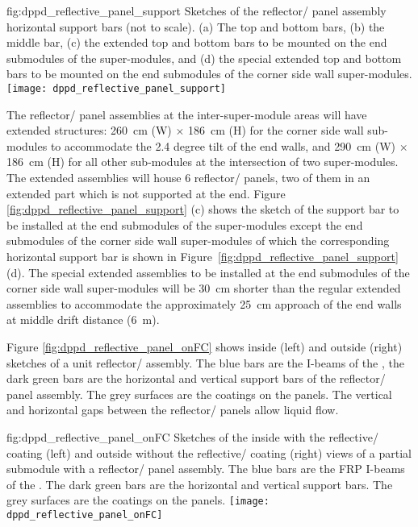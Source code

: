 \begin{dunefigure}{fig:dppd_reflective_panel_support}
{Sketches of the reflector/ panel assembly horizontal support bars (not to scale). (a) The top and bottom bars, (b) the middle bar, (c) the extended top and bottom bars to be mounted on the end submodules of the  super-modules, and (d) the special extended top and bottom bars to be mounted on the end submodules of the corner  side wall super-modules.}
\texttt{[image: dppd\_reflective\_panel\_support]}
\end{dunefigure}

The reflector/ panel assemblies at the inter-super-module areas will have extended structures: \SI{260}{\cm} (W) $\times$ \SI{186}{\cm} (H) for the corner side wall  sub-modules to accommodate the \num{2.4} degree tilt of the end walls, and \SI{290}{\cm} (W) $\times$ \SI{186}{\cm} (H) for all other  sub-modules at the intersection of two  super-modules. The extended assemblies will house \num{6} reflector/ panels, two of them in an extended part which is not supported at the end. Figure \ref{fig:dppd_reflective_panel_support} (c) shows the sketch of the support bar to be installed at the end submodules of the  super-modules except the end submodules of the corner  side wall super-modules of which the corresponding horizontal support bar is shown in Figure~\ref{fig:dppd_reflective_panel_support} (d). The special extended assemblies to be installed at the end submodules of the corner side wall super-modules will be \SI{30}{\cm} shorter than the regular extended assemblies to accommodate the approximately \SI{25}{\cm} approach of the end walls at middle drift distance (\SI{6}{\m}).

Figure \ref{fig:dppd_reflective_panel_onFC} shows inside (left) and outside (right) sketches of a unit reflector/ assembly. The blue bars are the I-beams of the , the dark green bars are the horizontal and vertical support bars of the reflector/ panel assembly. The grey surfaces are the  coatings on the panels. The vertical and horizontal gaps between the reflector/ panels allow liquid flow. 

\begin{dunefigure}{fig:dppd_reflective_panel_onFC}
{Sketches of the inside with the reflective/ coating (left) and outside without the reflective/ coating (right) views of a partial  submodule with a reflector/ panel assembly. The blue bars are the FRP I-beams of the . The dark green bars are the horizontal and vertical support bars. The grey surfaces are the  coatings on the panels.}
\texttt{[image: dppd\_reflective\_panel\_onFC]}
\end{dunefigure}